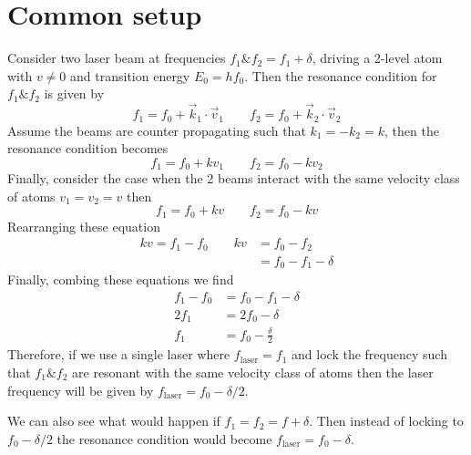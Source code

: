 \section{Common setup}
Consider two laser beam at frequencies $f_1 \& f_2=f_1 + \delta$, driving a 2-level atom with $v\neq0$ and transition energy $E_0=hf_0$.
Then the resonance condition for $f_1 \& f_2$ is given by
\begin{equation}
	f_1 = f_0 +  \vec{k}_1 \cdot \vec{v}_1 \qquad f_2 = f_0 +  \vec{k}_2 \cdot \vec{v}_2
\end{equation}
Assume the beams are counter propagating such that $k_1=-k_2=k$, then the resonance condition becomes
\begin{equation}
	f_1 = f_0 +  k v_1 \qquad f_2 = f_0 - k v_2
\end{equation}
Finally, consider the case when the 2 beams interact with the same velocity class of atoms $v_1=v_2=v$ then
\begin{equation}
	f_1 = f_0 +  k v \qquad f_2 = f_0 - k v
\end{equation}
Rearranging these equation
\begin{equation}
\begin{split}
	k v = f_1 - f_0 \qquad k v &= f_0 - f_2 \\
							  &= f_0 - f_1 - \delta
\end{split}
\end{equation}
Finally, combing these equations we find
\begin{equation}
\begin{split}
	f_1 - f_0 &= f_0 - f_1 - \delta \\
		 2f_1 &= 2f_0 - \delta \\
  f_1  &=   f_0 - \frac{\delta}{2}
\end{split}
\end{equation}
Therefore, if we use a single laser where $f_{\text{laser}}=f_1$ and lock the frequency such that $f_1 \& f_2$ are resonant with the same velocity class of atoms then the laser frequency will be given by $f_{\text{laser}}=f_0 - \delta/2$.

We can also see what would happen if $f_1=f_2=f+\delta$. 
Then instead of locking to $f_0-\delta/2$ the resonance condition would become $f_{\text{laser}}=f_0-\delta$.

